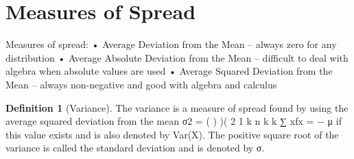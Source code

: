\documentclass[10pt,]{book}
\theoremstyle{plain}
\theoremstyle{definition}
\newtheorem{definition}[theorem]{Definition}
\theoremstyle{definition}
\theoremstyle{definition}
\numberwithin{equation}{section}
\begin{document}
\section[{Measures of Spread}]{Measures of Spread}\label{section-43}
Measures of spread:
• Average Deviation from the Mean – always zero for any distribution
• Average Absolute Deviation from the Mean – difficult to deal with algebra when absolute values are used
• Average Squared Deviation from the Mean – always non-negative and good with algebra and calculus 
%
\begin{definition}[{Variance}]\label{definition-33}
The variance is a measure of spread found by using the average squared deviation from the mean
σ2
 = ( ) )(
2
1
k
n
k
k ∑ xfx =
− μ
if this value exists and is also denoted by Var(X). The positive square root of the variance is called the standard deviation
and is denoted by σ. \end{definition}
\end{document}
